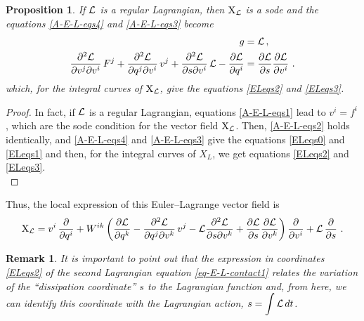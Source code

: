 \documentclass[12pt]{report}
\newtheorem{prop}[teor]{Proposition}
\newtheorem{remark}[teor]{Remark}
\def\qed{\ifvmode\removelastskip\fi
{\unskip\nobreak\hfil\penalty50\hbox{}\nobreak\hfil
\hbox{\vrule height1.2ex width1.2ex}\parfillskip=0pt
\finalhyphendemerits=0 \par\smallskip}}
\def\Lag{{\cal L}}
\def\X{{\rm X}}
\begin{document}
\begin{prop}
\label{ELeq-teor}
If $\Lag$ is a regular Lagrangian, then $\X_\Lag$ is a {\sc sode} and
the equations \eqref{A-E-L-eqs4} and \eqref{A-E-L-eqs3} become
\begin{align}
\label{ELeqs0}
g&=\Lag \,,
\\
\label{ELeqs1}
\displaystyle\frac{\partial^2\Lag}{\partial v^j \partial v^i}\,
F^j +\displaystyle\frac{\partial^2\Lag}{\partial q^j \partial v^i} \,v^j  +
\displaystyle \frac{\partial^2\Lag}{\partial s \partial v^i}\,\Lag
-\displaystyle\frac{\partial\Lag}{ \partial q^i}&=
\displaystyle\frac{\partial\Lag}{\partial s}\displaystyle\frac{\partial\Lag}{\partial v^i} \ .
\end{align}
which, for the integral curves of $\X_\Lag$, give 
the equations \eqref{ELeqs2} and \eqref{ELeqs3}.
\end{prop}
\begin{proof}
In fact, if $\Lag$ is a regular Lagrangian, equations \eqref{A-E-L-eqs1} lead to $v^i=f^i$, 
which are the {\sc sode} condition for the vector field $\X_\Lag$.
Then, \eqref{A-E-L-eqs2} holds identically, and
\eqref{A-E-L-eqs4} and \eqref{A-E-L-eqs3} give the equations \eqref{ELeqs0} and \eqref{ELeqs1}
and then, for the integral curves of $X_L$, we get equations \eqref{ELeqs2} and \eqref{ELeqs3}.
\\ \qed \end{proof}

Thus, the local expression of this Euler--Lagrange vector field is
\begin{equation}
\label{sode-coor}
\X_\Lag=
v^i\,\frac{\partial}{\partial q^i}
+W^{ik}
\left(
\frac{\partial\Lag}{ \partial q^k} 
-\frac{\partial^2\Lag}{\partial q^j \partial v^k} \,v^j
-\Lag\frac{\partial^2\Lag}{\partial s \partial v^k} 
+\frac{\partial\Lag}{\partial s}
 \frac{\partial\Lag}{\partial v^k} 
\right)
\frac{\partial}{\partial v^i}+
\Lag\,\frac{\partial}{\partial s}\ .
\end{equation}

\begin{remark}{\rm
It is important to point out that
the expression in coordinates \eqref{ELeqs2} of
the second Lagrangian equation \eqref{eq-E-L-contact1} relates the variation 
of the ``dissipation coordinate'' $s$ to the Lagrangian function and, from here, 
we can identify this coordinate with the Lagrangian action, $\displaystyle s=\int{\cal L}\,dt$.
}\end{remark}
\end{document}
